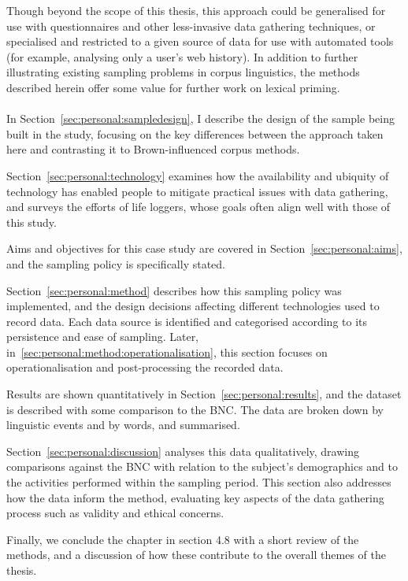 Though beyond the scope of this thesis, this approach could be generalised for use with questionnaires and other less-invasive data gathering techniques, or specialised and restricted to a given source of data for use with automated tools (for example, analysing only a user's web history).  In addition to further illustrating existing sampling problems in corpus linguistics, the methods described herein offer some value for further work on lexical priming.


\paragraph{}
In Section~\ref{sec:personal:sampledesign}, I describe the design of the sample being built in the study, focusing on the key differences between the approach taken here and contrasting it to Brown-influenced corpus methods.

Section~\ref{sec:personal:technology} examines how the availability and ubiquity of technology has enabled people to mitigate practical issues with data gathering, and surveys the efforts of life loggers, whose goals often align well with those of this study.

Aims and objectives for this case study are covered in Section~\ref{sec:personal:aims}, and the sampling policy is specifically stated.

Section~\ref{sec:personal:method} describes how this sampling policy was implemented, and the design decisions affecting different technologies used to record data.  Each data source is identified and categorised according to its persistence and ease of sampling.  Later, in~\ref{sec:personal:method:operationalisation}, this section focuses on operationalisation and post-processing the recorded data.

Results are shown quantitatively in Section~\ref{sec:personal:results}, and the dataset is described with some comparison to the BNC\@.  The data are broken down by linguistic events and by words, and summarised.

Section~\ref{sec:personal:discussion} analyses this data qualitatively, drawing comparisons against the BNC with relation to the subject's demographics and to the activities performed within the sampling period.  This section also addresses how the data inform the method, evaluating key aspects of the data gathering process such as validity and ethical concerns.

Finally, we conclude the chapter in section 4.8 with a short review of the methods, and a discussion of how these contribute to the overall themes of the thesis.


